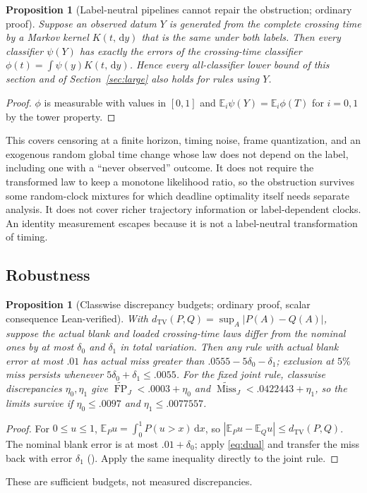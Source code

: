 \documentclass[11pt,a4paper]{article}
\theoremstyle{plain}
\newtheorem{proposition}[theorem]{Proposition}
\theoremstyle{definition}
\theoremstyle{remark}
\newcommand{\E}{\mathbb E}
\newcommand{\FP}{\operatorname{FP}}
\newcommand{\Miss}{\operatorname{Miss}}
\newcommand{\TV}{d_{\mathrm{TV}}}
\newcommand{\dd}{\,\mathrm d}
\begin{document}
\begin{proposition}[Label-neutral pipelines cannot repair the obstruction; ordinary proof]\label{prop:pipeline}
Suppose an observed datum $Y$ is generated from the complete crossing time by a Markov kernel $K(t,\dd y)$ that is the same under both labels. Then every classifier $\psi(Y)$ has exactly the errors of the crossing-time classifier $\phi(t)=\int\psi(y)K(t,\dd y)$. Hence every all-classifier lower bound of this section and of Section~\ref{sec:large} also holds for rules using $Y$.
\end{proposition}
\begin{proof}
$\phi$ is measurable with values in $[0,1]$ and $\E_i\psi(Y)=\E_i\phi(T)$ for $i=0,1$ by the tower property.
\end{proof}
This covers censoring at a finite horizon, timing noise, frame quantization, and an exogenous random global time change whose law does not depend on the label, including one with a ``never observed'' outcome. It does not require the transformed law to keep a monotone likelihood ratio, so the obstruction survives some random-clock mixtures for which deadline optimality itself needs separate analysis. It does not cover richer trajectory information or label-dependent clocks. An identity measurement escapes because it is not a label-neutral transformation of timing.

\subsection{Robustness}\label{sec:robust}
\begin{proposition}[Classwise discrepancy budgets; ordinary proof, scalar consequence Lean-verified]\label{prop:tv}
With $\TV(P,Q)=\sup_A|P(A)-Q(A)|$, suppose the actual blank and loaded crossing-time laws differ from the nominal ones by at most $\delta_0$ and $\delta_1$ in total variation. Then any rule with actual blank error at most $.01$ has actual miss greater than $.0555-5\delta_0-\delta_1$; exclusion at $5\%$ miss persists whenever $5\delta_0+\delta_1\le.0055$. For the fixed joint rule, classwise discrepancies $\eta_0,\eta_1$ give $\widetilde{\FP}_J<.0003+\eta_0$ and $\widetilde{\Miss}_J<.0422443+\eta_1$, so the limits survive if $\eta_0\le.0097$ and $\eta_1\le.0077557$.
\end{proposition}
\begin{proof}
For $0\le u\le1$, $\E_Pu=\int_0^1P(u>x)\dd x$, so $|\E_Pu-\E_Qu|\le\TV(P,Q)$. The nominal blank error is at most $.01+\delta_0$; apply \eqref{eq:dual} and transfer the miss back with error $\delta_1$ (). Apply the same inequality directly to the joint rule.
\end{proof}
These are sufficient budgets, not measured discrepancies.
\end{document}

